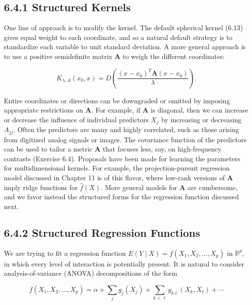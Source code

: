 \documentclass[10pt]{article}
\begin{document}
\subsection*{6.4.1 Structured Kernels}
One line of approach is to modify the kernel. The default spherical kernel (6.13) gives equal weight to each coordinate, and so a natural default strategy is to standardize each variable to unit standard deviation. A more general approach is to use a positive semidefinite matrix $\mathbf{A}$ to weigh the different coordinates:


\begin{equation*}
K_{\lambda, A}\left(x_{0}, x\right)=D\left(\frac{\left(x-x_{0}\right)^{T} \mathbf{A}\left(x-x_{0}\right)}{\lambda}\right) . \tag{6.14}
\end{equation*}


Entire coordinates or directions can be downgraded or omitted by imposing appropriate restrictions on $\mathbf{A}$. For example, if $\mathbf{A}$ is diagonal, then we can increase or decrease the influence of individual predictors $X_{j}$ by increasing or decreasing $A_{j j}$. Often the predictors are many and highly correlated, such as those arising from digitized analog signals or images. The covariance function of the predictors can be used to tailor a metric $\mathbf{A}$ that focuses less, say, on high-frequency contrasts (Exercise 6.4). Proposals have been made for learning the parameters for multidimensional kernels. For example, the projection-pursuit regression model discussed in Chapter 11 is of this flavor, where low-rank versions of $\mathbf{A}$ imply ridge functions for $\hat{f}(X)$. More general models for $\mathbf{A}$ are cumbersome, and we favor instead the structured forms for the regression function discussed next.

\subsection*{6.4.2 Structured Regression Functions}
We are trying to fit a regression function $E(Y \mid X)=f\left(X_{1}, X_{2}, \ldots, X_{p}\right)$ in $\mathbb{R}^{p}$, in which every level of interaction is potentially present. It is natural to consider analysis-of-variance (ANOVA) decompositions of the form


\begin{equation*}
f\left(X_{1}, X_{2}, \ldots, X_{p}\right)=\alpha+\sum_{j} g_{j}\left(X_{j}\right)+\sum_{k<\ell} g_{k \ell}\left(X_{k}, X_{\ell}\right)+\cdots \tag{6.15}
\end{equation*}
\end{document}
